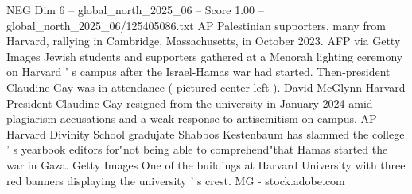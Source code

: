 \begin{textsample}{NEG Dim 6 – global\_north\_2025\_06 – Score 1.00 – global\_north\_2025\_06/125405086.txt}
AP Palestinian supporters, many from Harvard, rallying in Cambridge, Massachusetts, in October 2023.
AFP via Getty Images Jewish students and supporters gathered at a Menorah lighting ceremony on Harvard ' s campus after the Israel-Hamas war had started.
Then-president Claudine Gay was in attendance ( pictured center left ).
David McGlynn Harvard President Claudine Gay resigned from the university in January 2024 amid plagiarism accusations and a weak response to antisemitism on campus.
AP Harvard Divinity School gradujate Shabbos Kestenbaum has slammed the college ' s yearbook editors for"not being able to comprehend"that Hamas started the war in Gaza.
Getty Images One of the buildings at Harvard University with three red banners displaying the university ' s crest.
MG - stock.adobe.com

\end{textsample}
